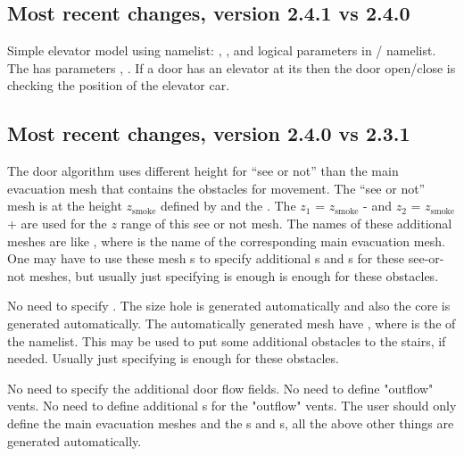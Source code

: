 \documentclass[12pt,a4paper,final,twoside]{stylevk}
\begin{document}
\subsection{Most recent changes, version 2.4.1 vs
  2.4.0}\label{Sec_241vs240} 

Simple elevator model using  namelist:
, , and
 logical parameters in
/ namelist.  The  has parameters
, .  If a door has an
elevator  at its  then the door open/close
is checking the position of the elevator car.

\subsection{Most recent changes, version 2.4.0 vs
  2.3.1}\label{Sec_240vs231} 

\noindent  The door algorithm uses different height for ``see or not''
than the main evacuation mesh that contains the obstacles for
movement.  The ``see or not'' mesh is at the height $z_\textrm{smoke}$
defined by  and the
.  The $z_1$ = $z_\textrm{smoke}$ -
 and $z_2$ = $z_\textrm{smoke}$ +
 are used for the $z$ range of this see or not
mesh.  The names of these additional meshes are like
, where  is the name of the
corresponding main evacuation mesh.  One may have to use these mesh
s to specify additional s and s for these see-or-not meshes,
but usually just specifying  is enough is
enough for these obstacles.

No need to specify .  The  size hole is
generated automatically and also the core  is generated
automatically.  The automatically generated mesh have
, where  is the 
of the  namelist.  This  may be used to put some
additional obstacles to the stairs, if needed.  Usually just
specifying  is enough for these obstacles.

No need to specify the additional door flow fields.  No need to define
"outflow" vents.  No need to define additional s for the "outflow"
vents.  The user should only define the main evacuation meshes and the
s and s, all the above other things are
generated automatically.
\end{document}
